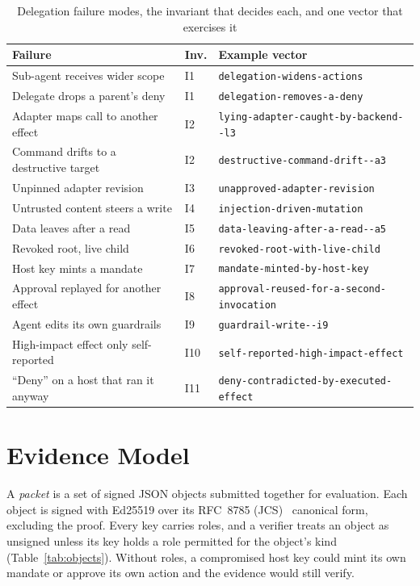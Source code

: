\documentclass[conference]{IEEEtran}
\newcommand{\vname}[1]{{\small\nolinkurl{#1}}}
\begin{document}
\begin{table}[t]
\caption{Delegation failure modes, the invariant that decides each, and one vector that exercises it}\label{tab:failures}
\centering\footnotesize
\begin{tabular}{@{}p{3.1cm}p{0.5cm}p{4.1cm}@{}}
\toprule
Failure & Inv. & Example vector \\
\midrule
Sub-agent receives wider scope & I1 & \vname{delegation-widens-actions} \\
Delegate drops a parent's deny & I1 & \vname{delegation-removes-a-deny} \\
Adapter maps call to another effect & I2 & \vname{lying-adapter-caught-by-backend--l3} \\
Command drifts to a destructive target & I2 & \vname{destructive-command-drift--a3} \\
Unpinned adapter revision & I3 & \vname{unapproved-adapter-revision} \\
Untrusted content steers a write & I4 & \vname{injection-driven-mutation} \\
Data leaves after a read & I5 & \vname{data-leaving-after-a-read--a5} \\
Revoked root, live child & I6 & \vname{revoked-root-with-live-child} \\
Host key mints a mandate & I7 & \vname{mandate-minted-by-host-key} \\
Approval replayed for another effect & I8 & \vname{approval-reused-for-a-second-invocation} \\
Agent edits its own guardrails & I9 & \vname{guardrail-write--i9} \\
High-impact effect only self-reported & I10 & \vname{self-reported-high-impact-effect} \\
``Deny'' on a host that ran it anyway & I11 & \vname{deny-contradicted-by-executed-effect} \\
\bottomrule
\end{tabular}
\end{table}

\section{Evidence Model}\label{sec:model}

A \emph{packet} is a set of signed JSON objects submitted together for evaluation. Each object is signed with Ed25519 over its RFC~8785 (JCS)~\cite{rfc8785} canonical form, excluding the proof. Every key carries roles, and a verifier treats an object as unsigned unless its key holds a role permitted for the object's kind (Table~\ref{tab:objects}). Without roles, a compromised host key could mint its own mandate or approve its own action and the evidence would still verify.
\end{document}
